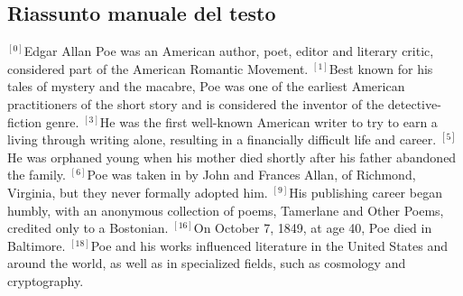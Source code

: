 \newpage
\begin{small}
\subsection*{Riassunto manuale del testo}
{$^{[0]}$}Edgar Allan Poe was an American author, poet, editor and literary critic, considered part of the American Romantic Movement. 
{$^{[1]}$}Best known for his tales of mystery and the macabre, Poe was one of the earliest American practitioners of the short story and is considered the inventor of the detective-fiction genre. 
{$^{[3]}$}He was the first well-known American writer to try to earn a living through writing alone, resulting in a financially difficult life and career.
{$^{[5]}$}He was orphaned young when his mother died shortly after his father abandoned the family. 
{$^{[6]}$}Poe was taken in by John and Frances Allan, of Richmond, Virginia, but they never formally adopted him. 
{$^{[9]}$}His publishing career began humbly, with an anonymous collection of poems, Tamerlane and Other Poems, credited only to a Bostonian.
{$^{[16]}$}On October 7, 1849, at age 40, Poe died in Baltimore. 
{$^{[18]}$}Poe and his works influenced literature in the United States and around the world, as well as in specialized fields, such as cosmology and cryptography. 
\vfill
\end{small}

